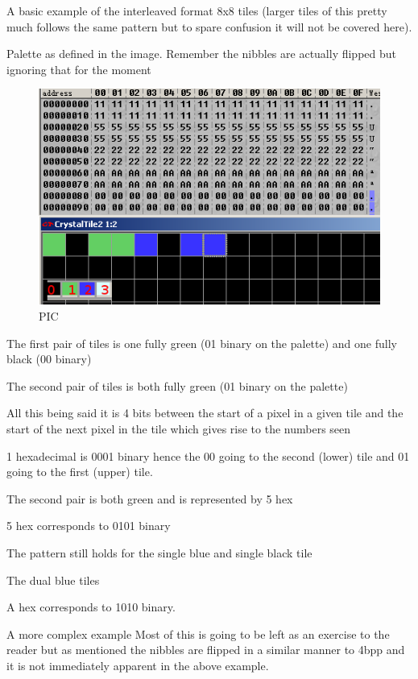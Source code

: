 \documentclass[
]{book}
\begin{document}
A basic example of the interleaved format 8x8 tiles (larger tiles of this pretty much follows the same pattern but to spare confusion it will not be covered here).

Palette as defined in the image. Remember the nibbles are actually flipped but ignoring that for the moment

\begin{figure}
\centering
\includegraphics{images/23_home_fast6191_romhackingguide_unrenamed_file___original_borders_romhackingguide2dGBA3XBPP1.png}
\caption{PIC}
\end{figure}

The first pair of tiles is one fully green (01 binary on the palette) and one fully black (00 binary)

The second pair of tiles is both fully green (01 binary on the palette)

All this being said it is 4 bits between the start of a pixel in a given tile and the start of the next pixel in the tile which gives rise to the numbers seen

1 hexadecimal is 0001 binary hence the 00 going to the second (lower) tile and 01 going to the first (upper) tile.

The second pair is both green and is represented by 5 hex

5 hex corresponds to 0101 binary

The pattern still holds for the single blue and single black tile

The dual blue tiles

A hex corresponds to 1010 binary.

A more complex example Most of this is going to be left as an exercise to the reader but as mentioned the nibbles are flipped in a similar manner to 4bpp and it is not immediately apparent in the above example.
\end{document}
